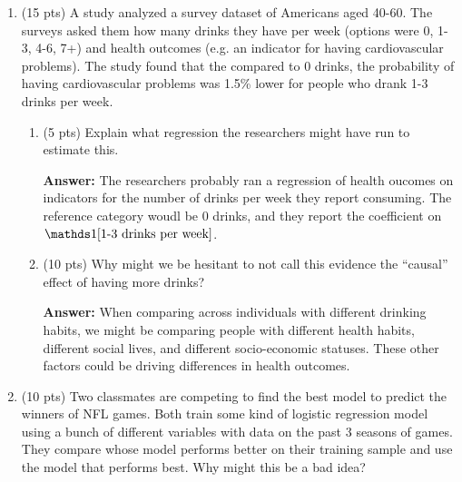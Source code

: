 \documentclass[12pt]{article}
\newcommand{\answer}[1]{{\color{blue_winged_teal}\textbf{Answer:} #1}}
\newcommand{\pts}[1]{{\color{zinc500}(#1 pts)}}
\begin{document}
\begin{enumerate}
\begin{enumerate}
    \item \pts{10} Say you want to let the relationship between height and points scored vary by position. Describe the regression you could run that would estimate different slopes by position, i.e. what terms would you include in your model?

    \answer{
      We could run a regression with the following terms:
      \begin{enumerate}
        \item Height
        \item Position indicators
        \item Height interacted with position indicators
      \end{enumerate}
      This would allow us to estimate different slopes for each position.
    }
  \end{enumerate}

  \bigskip
  \item \pts{15} A study analyzed a survey dataset of Americans aged 40-60. The surveys asked them how many drinks they have per week (options were 0, 1-3, 4-6, 7+) and health outcomes (e.g. an indicator for having cardiovascular problems).
  The study found that the compared to 0 drinks, the probability of having cardiovascular problems was 1.5\% lower for people who drank 1-3 drinks per week.
  \begin{enumerate}
    \item \pts{5} Explain what regression the researchers might have run to estimate this.

    \answer{
      The researchers probably ran a regression of health oucomes on indicators for the number of drinks per week they report consuming.
      The reference category woudl be 0 drinks, and they report the coefficient on $\one{\text{1-3 drinks per week}}$.
    }


    \item \pts{10} Why might we be hesitant to not call this evidence the ``causal'' effect of having more drinks?

    \answer{
      When comparing across individuals with different drinking habits, we might be comparing people with different health habits, different social lives, and different socio-economic statuses.
      These other factors could be driving differences in health outcomes.
    }
  \end{enumerate}


  \bigskip
  \item \pts{10} Two classmates are competing to find the best model to predict the winners of NFL games. Both train some kind of logistic regression model using a bunch of different variables with data on the past 3 seasons of games. They compare whose model performs better on their training sample and use the model that performs best. Why might this be a bad idea?


\end{enumerate}
\end{document}
